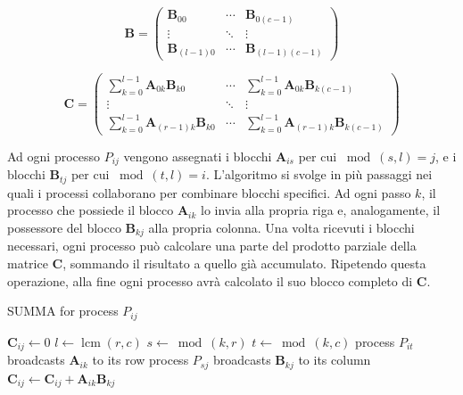\documentclass[a4paper]{article}
\DeclareMathOperator{\lcm}{lcm}
\begin{document}
$$
    \mathbf{B}=
    \begin{pmatrix}
        \mathbf{B}_{00}     & \cdots & \mathbf{B}_{0(c-1)}     \\
        \vdots              & \ddots & \vdots                  \\
        \mathbf{B}_{(l-1)0} & \cdots & \mathbf{B}_{(l-1)(c-1)}
    \end{pmatrix}
$$

$$
    \mathbf{C}=
    \begin{pmatrix}
        \sum_{k=0}^{l-1}\mathbf{A}_{0k}\mathbf{B}_{k0}     & \cdots & \sum_{k=0}^{l-1}\mathbf{A}_{0k}\mathbf{B}_{k(c-1)}     \\
        \vdots                                             & \ddots & \vdots                                                 \\
        \sum_{k=0}^{l-1}\mathbf{A}_{(r-1)k}\mathbf{B}_{k0} & \cdots & \sum_{k=0}^{l-1}\mathbf{A}_{(r-1)k}\mathbf{B}_{k(c-1)}
    \end{pmatrix}
$$

Ad ogni processo $P_{ij}$ vengono assegnati i blocchi $\mathbf{A}_{is}$ per cui $\bmod(s,l)=j$, e i blocchi $\mathbf{B}_{tj}$ per cui $\bmod(t,l)=i$.
L'algoritmo si svolge in più passaggi nei quali i processi collaborano per combinare blocchi specifici. Ad ogni passo $k$, il processo che possiede il blocco $\mathbf{A}_{ik}$ lo invia alla propria riga e, analogamente, il possessore del blocco $\mathbf{B}_{kj}$ alla propria colonna.
Una volta ricevuti i blocchi necessari, ogni processo può calcolare una parte del prodotto parziale della matrice $\mathbf{C}$, sommando il risultato a quello già accumulato. Ripetendo questa operazione, alla fine ogni processo avrà calcolato il suo blocco completo di $\mathbf{C}$.

\begin{algorithm}[h]
    \caption{SUMMA for process $P_{ij}$}
    \begin{algorithmic}
        \State $\mathbf{C}_{ij} \gets 0$
        \State $l \gets \lcm(r,c)$
        \State $s \gets \bmod(k, r)$
        \State $t \gets \bmod(k, c)$
        \State process $P_{it}$ broadcasts $\mathbf{A}_{ik}$ to its row
        \State process $P_{sj}$ broadcasts $\mathbf{B}_{kj}$ to its column
        \State $\mathbf{C}_{ij} \gets \mathbf{C}_{ij} + \mathbf{A}_{ik}\mathbf{B}_{kj}$
        \EndFor
    \end{algorithmic}
\end{algorithm}
\end{document}
